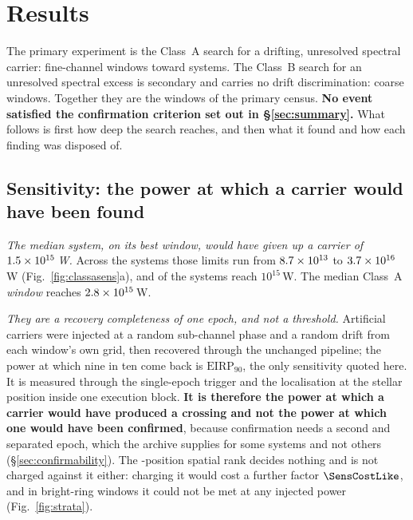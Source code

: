 \section{Results}
\label{sec:results}

The primary experiment is the Class~A search for a drifting, unresolved
spectral carrier: \NWinA{} fine-channel windows toward \NSysClassA{}
systems. The Class~B search for an unresolved spectral excess is secondary
and carries no drift discrimination: \NWinB{} coarse windows. Together they
are the \NWindows{} windows of the primary census. \textbf{No event
satisfied the confirmation criterion set out in \S\ref{sec:summary}.} What
follows is first how deep the search reaches, and then what it found and how
each finding was disposed of.

\subsection{Sensitivity: the power at which a carrier would have been
found} \label{sec:pninetysel}

\emph{The median system, on its best window, would have given up a carrier
of $1.5\times10^{15}$\,W.} Across the \NSysClassA{} systems those limits
run from $8.7\times10^{13}$ to $3.7\times10^{16}$\,W
(Fig.~\ref{fig:classasens}a), and \NSysEfifteen{} of the systems reach
$10^{15}$\,W. The median Class~A \emph{window} reaches
$2.8\times10^{15}$\,W.

\emph{They are a recovery completeness of one epoch, and not a threshold.}
Artificial carriers were injected at a random sub-channel phase and a random
drift from each window's own grid, then recovered through the unchanged
pipeline; the power at which nine in ten come back is
$\mathrm{EIRP}_{90}$, the only sensitivity quoted here. It is measured
through the single-epoch trigger and the localisation at the stellar position
inside one execution block. \textbf{It is therefore the power at which a
carrier would have produced a crossing and not the power at which one would
have been confirmed}, because confirmation needs a second and separated epoch, which the archive
supplies for some systems and not others (\S\ref{sec:confirmability}). The \NCtrl-position spatial rank
decides nothing and is not charged against it either: charging it would cost
a further factor $\SensCostLike$, and in \SensNRingHiUnres{} bright-ring
windows it could not be met at any injected power (Fig.~\ref{fig:strata}).

